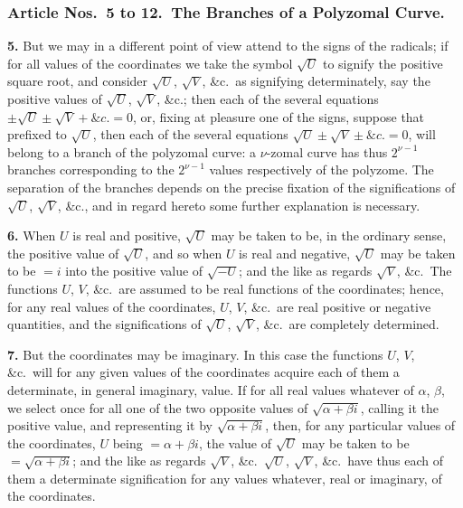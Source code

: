 \documentclass[11pt,a4paper]{article}
\theoremstyle{definition}
\begin{document}
\subsubsection*{Article Nos.\ 5 to 12.\ The Branches of a Polyzomal Curve.}

\setcounter{page}{475}

\noindent\textbf{5.} But we may in a different point of view attend to the signs of the radicals; if for all values of the coordinates we take the symbol $\sqrt{U}$ to signify the positive square root, and consider $\sqrt{U}$, $\sqrt{V}$, \&c.\ as signifying determinately, say the positive values of $\sqrt{U}$, $\sqrt{V}$, \&c.; then each of the several equations $\pm\sqrt{U}\pm\sqrt{V}+\&c.=0$, or, fixing at pleasure one of the signs, suppose that prefixed to $\sqrt{U}$, then each of the several equations $\sqrt{U}\pm\sqrt{V}\pm\&c.=0$, will belong to a branch of the polyzomal curve: a $\nu$-zomal curve has thus $2^{\nu-1}$ branches corresponding to the $2^{\nu-1}$ values respectively of the polyzome. The separation of the branches depends on the precise fixation of the significations of $\sqrt{U}$, $\sqrt{V}$, \&c., and in regard hereto some further explanation is necessary.

\noindent\textbf{6.} When $U$ is real and positive, $\sqrt{U}$ may be taken to be, in the ordinary sense, the positive value of $\sqrt{U}$, and so when $U$ is real and negative, $\sqrt{U}$ may be taken to be $=i$ into the positive value of $\sqrt{-U}$; and the like as regards $\sqrt{V}$, \&c.\ The functions $U$, $V$, \&c.\ are assumed to be real functions of the coordinates; hence, for any real values of the coordinates, $U$, $V$, \&c.\ are real positive or negative quantities, and the significations of $\sqrt{U}$, $\sqrt{V}$, \&c.\ are completely determined.

\noindent\textbf{7.} But the coordinates may be imaginary. In this case the functions $U$, $V$, \&c.\ will for any given values of the coordinates acquire each of them a determinate, in general imaginary, value. If for all real values whatever of $\alpha$, $\beta$, we select once for all one of the two opposite values of $\sqrt{\alpha+\beta i}$, calling it the positive value, and representing it by $\sqrt{\alpha+\beta i}$, then, for any particular values of the coordinates, $U$ being $=\alpha+\beta i$, the value of $\sqrt{U}$ may be taken to be $=\sqrt{\alpha+\beta i}$; and the like as regards $\sqrt{V}$, \&c.\ $\sqrt{U}$, $\sqrt{V}$, \&c.\ have thus each of them a determinate signification for any values whatever, real or imaginary, of the coordinates.
\end{document}
